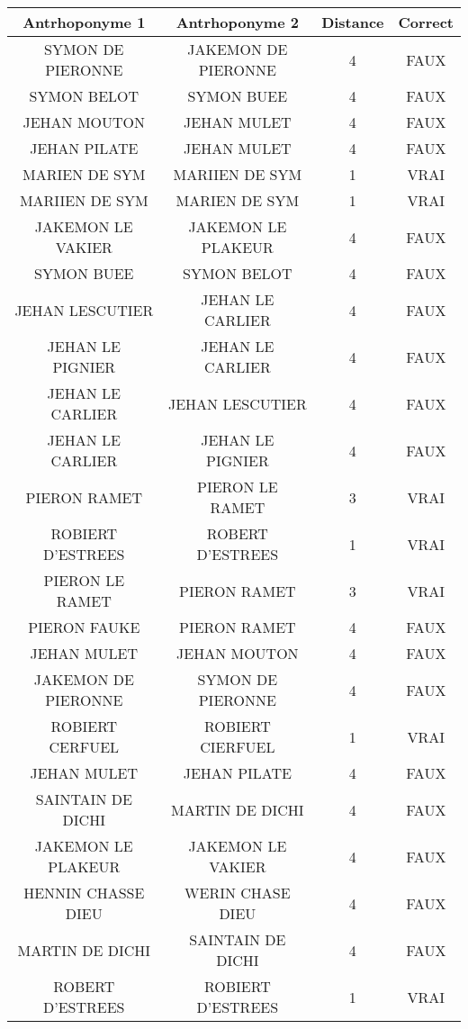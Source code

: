 \small
\begin{table}[ht]
    \centering
    \begin{tabular}{|c|c|c|c|}
\hline	Antrhoponyme 1	&	Antrhoponyme 2	&	Distance	&	Correct	\\
\hline
\hline	SYMON DE PIERONNE	&	JAKEMON DE PIERONNE	&	4	&	FAUX	\\
\hline	SYMON BELOT	&	SYMON BUEE	&	4	&	FAUX	\\
\hline	JEHAN MOUTON	&	JEHAN MULET	&	4	&	FAUX	\\
\hline	JEHAN PILATE	&	JEHAN MULET	&	4	&	FAUX	\\
\hline	MARIEN DE SYM	&	MARIIEN DE SYM	&	1	&	VRAI	\\
\hline	MARIIEN DE SYM	&	MARIEN DE SYM	&	1	&	VRAI	\\
\hline	JAKEMON LE VAKIER	&	JAKEMON LE PLAKEUR	&	4	&	FAUX	\\
\hline	SYMON BUEE	&	SYMON BELOT	&	4	&	FAUX	\\
\hline	JEHAN LESCUTIER	&	JEHAN LE CARLIER	&	4	&	FAUX	\\
\hline	JEHAN LE PIGNIER	&	JEHAN LE CARLIER	&	4	&	FAUX	\\
\hline	JEHAN LE CARLIER	&	JEHAN LESCUTIER	&	4	&	FAUX	\\
\hline	JEHAN LE CARLIER	&	JEHAN LE PIGNIER	&	4	&	FAUX	\\
\hline	PIERON RAMET	&	PIERON LE RAMET	&	3	&	VRAI	\\
\hline	ROBIERT D'ESTREES	&	ROBERT D'ESTREES	&	1	&	VRAI	\\
\hline	PIERON LE RAMET	&	PIERON RAMET	&	3	&	VRAI	\\
\hline	PIERON FAUKE	&	PIERON RAMET	&	4	&	FAUX	\\
\hline	JEHAN MULET	&	JEHAN MOUTON	&	4	&	FAUX	\\
\hline	JAKEMON DE PIERONNE	&	SYMON DE PIERONNE	&	4	&	FAUX	\\
\hline	ROBIERT CERFUEL	&	ROBIERT CIERFUEL	&	1	&	VRAI	\\
\hline	JEHAN MULET	&	JEHAN PILATE	&	4	&	FAUX	\\
\hline	SAINTAIN DE DICHI	&	MARTIN DE DICHI	&	4	&	FAUX	\\
\hline	JAKEMON LE PLAKEUR	&	JAKEMON LE VAKIER	&	4	&	FAUX	\\
\hline	HENNIN CHASSE DIEU	&	WERIN CHASE DIEU	&	4	&	FAUX	\\
\hline	MARTIN DE DICHI	&	SAINTAIN DE DICHI	&	4	&	FAUX	\\
\hline	ROBERT D'ESTREES	&	ROBIERT D'ESTREES	&	1	&	VRAI	\\

\end{tabular}
\end{table}

